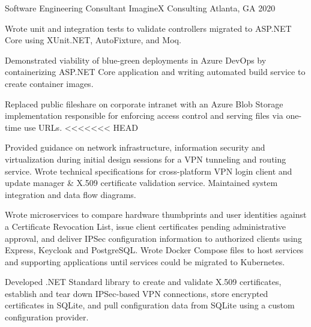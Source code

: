 

\begin{cventries}

  \cventry
    {Software Engineering Consultant} %
    {ImagineX Consulting} %
    {Atlanta, GA} %
    {2020} %
    {
      \begin{cvitems} %
        \item {Wrote unit and integration tests to validate controllers migrated to ASP.NET Core using XUnit.NET, AutoFixture, and Moq.}
        \item {Demonstrated viability of blue-green deployments in Azure DevOps by containerizing ASP.NET Core application and writing automated build service to create container images.}
        \item {Replaced public fileshare on corporate intranet with an Azure Blob Storage implementation responsible for enforcing access control and serving files via one-time use URLs.}
<<<<<<< HEAD
        \item {Provided guidance on network infrastructure, information security and virtualization during initial design sessions for a VPN tunneling and routing service. Wrote technical specifications for cross-platform VPN login client and update manager \& X.509 certificate validation service. Maintained system integration and data flow diagrams.}
        \item {Wrote microservices to compare hardware thumbprints and user identities against a Certificate Revocation List, issue client certificates pending administrative approval, and deliver IPSec configuration information to authorized clients using Express, Keycloak and PostgreSQL. Wrote Docker Compose files to host services and supporting applications until services could be migrated to Kubernetes.}
        \item {Developed .NET Standard library to create and validate X.509 certificates, establish and tear down IPSec-based VPN connections, store encrypted certificates in SQLite, and pull configuration data from SQLite using a custom configuration provider.}

\end{cvitems}}
\end{cventries}
